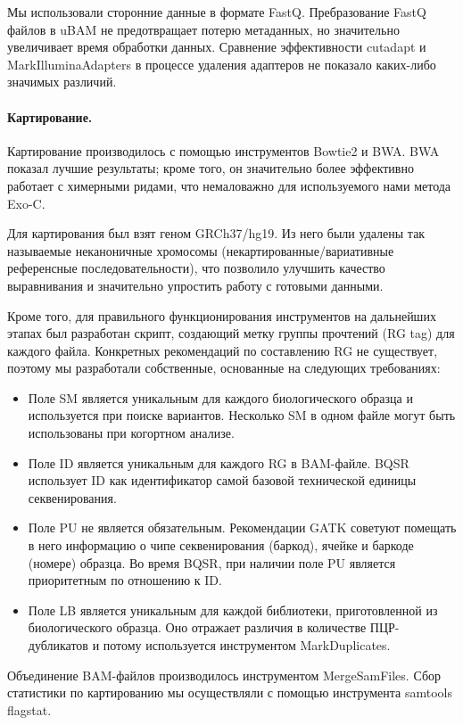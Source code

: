 \documentclass[a4paper,12pt]{article}
\begin{document}
Мы использовали сторонние данные в формате FastQ.
Пребразование FastQ файлов в uBAM не предотвращает потерю метаданных, но значительно увеличивает время обработки данных.
Сравнение эффективности cutadapt и MarkIlluminaAdapters в процессе удаления адаптеров не показало каких-либо значимых различий.

\paragraph{Картирование.}
Картирование производилось с помощью инструментов Bowtie2\cite{bowtie2} и BWA\cite{bwa}.
BWA показал лучшие результаты;
кроме того, он значительно более эффективно работает с химерными ридами, что немаловажно для используемого нами метода Exo-C.

Для картирования был взят геном GRCh37/hg19.
Из него были удалены так называемые неканоничные хромосомы (некартированные/вариативные референсные последовательности), что позволило улучшить качество выравнивания и значительно упростить работу с готовыми данными.

Кроме того, для правильного функционирования инструментов на дальнейших этапах был разработан скрипт, создающий метку группы прочтений (RG tag) для каждого файла.
Конкретных рекомендаций по составлению RG не существует, поэтому мы разработали собственные, основанные на следующих требованиях\cite{gatk}:

\begin{itemize}
\item Поле SM является уникальным для каждого биологического образца и используется при поиске вариантов.
Несколько SM в одном файле могут быть использованы при когортном анализе.
\item Поле ID является уникальным для каждого RG в BAM-файле.
BQSR использует ID как идентификатор самой базовой технической единицы секвенирования.
\item Поле PU не является обязательным.
Рекомендации GATK советуют помещать в него информацию о чипе секвенирования (баркод), ячейке и баркоде (номере) образца.
Во время BQSR, при наличии поле PU является приоритетным по отношению к ID.
\item Поле LB является уникальным для каждой библиотеки, приготовленной из биологического образца.
Оно отражает различия в количестве ПЦР-дубликатов и потому используется инструментом MarkDuplicates.
\end{itemize}

Объединение BAM-файлов производилось инструментом MergeSamFiles.
Сбор статистики по картированию мы осуществляли с помощью инструмента samtools flagstat.
\end{document}
